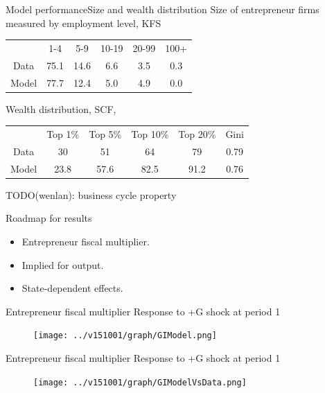 \documentclass[svgnames]{beamer}
\begin{document}
\begin{frame}{Model performance}{Size and wealth distribution}
Size of entrepreneur firms measured by employment level, KFS
\begin{table}[htbp]
  \centering
  
    \begin{tabular}{cccccc}
    \toprule
    & 1-4 & 5-9 & 10-19 & 20-99 & 100+ \\
    Data & 75.1 & 14.6 &  6.6  & 3.5  & 0.3 \\
    Model & 77.7 & 12.4 & 5.0 & 4.9 & 0.0 \\
    \bottomrule
    \end{tabular}%
    
\end{table}
Wealth distribution, SCF, \citet{diaz-gimenez_facts_2011}
\begin{table}[htbp]
  \centering
  
    \begin{tabular}{cccccc}
    \toprule
    & Top 1\% & Top 5\% & Top 10\% & Top 20\% & Gini\\
    Data & 30 & 51 & 64 & 79 & 0.79 \\
Model & 23.8 & 57.6 & 82.5 & 91.2 & 0.76 \\
\bottomrule
    \end{tabular}%
\end{table}

TODO(wenlan): business cycle property
\end{frame}

\begin{frame}{Roadmap for results}
\begin{itemize}
\item Entrepreneur fiscal multiplier.
\item Implied for output.
\item State-dependent effects.
\end{itemize}
\end{frame}

\begin{frame}{Entrepreneur fiscal multiplier}
{Response to +G shock at period 1}
\begin{figure}[!ht]
\texttt{[image: ../v151001/graph/GIModel.png]}
\end{figure}
\end{frame}

\begin{frame}{Entrepreneur fiscal multiplier}
{Response to +G shock at period 1}
\begin{figure}[!ht]
\texttt{[image: ../v151001/graph/GIModelVsData.png]}
\end{figure}
\end{frame}
\end{document}
